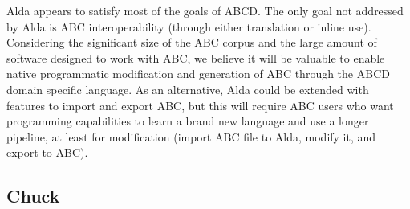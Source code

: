 Alda appears to satisfy most of the goals of ABCD. The only goal not addressed by Alda is ABC interoperability (through either translation or inline use). Considering the significant size of the ABC corpus and the large amount of software designed to work with ABC, we believe it will be valuable to enable native programmatic modification and generation of ABC through the ABCD domain specific language. As an alternative, Alda could be extended with features to import and export ABC, but this will require ABC users who want programming capabilities to learn a brand new language and use a longer pipeline, at least for modification (import ABC file to Alda, modify it, and export to ABC).

\subsection{Chuck}

